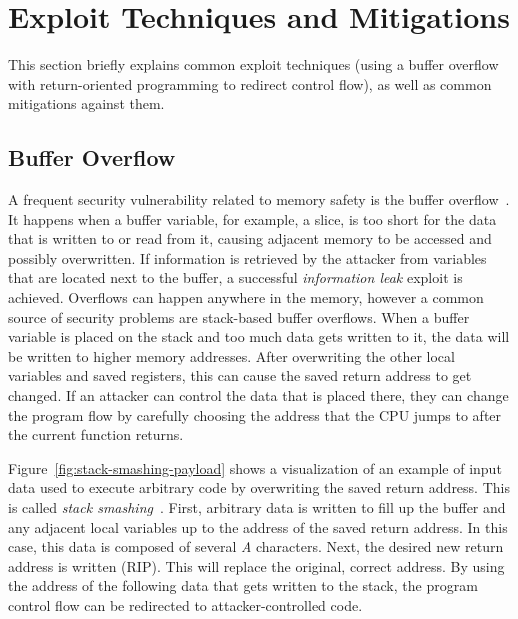
\section{Exploit Techniques and Mitigations}\label{sec:background:exploit-techniques}

This section briefly explains common exploit techniques (using a buffer overflow with return-oriented programming to
redirect control flow), as well as common mitigations against them.



\subsection{Buffer Overflow}\label{subsec:background:exploit-techniques:buffer-overflow}

A frequent security vulnerability related to memory safety is the buffer overflow~\cite{larochelle2001}.
It happens when a buffer variable, for example, a slice, is too short for the data that is written to or read from it,
causing adjacent memory to be accessed and possibly overwritten.
If information is retrieved by the attacker from variables that are located next to the buffer, a successful
\textit{information leak} exploit is achieved.
Overflows can happen anywhere in the memory, however a common source of security problems are stack-based buffer
overflows.
When a buffer variable is placed on the stack and too much data gets written to it, the data will be written to higher
memory addresses.
After overwriting the other local variables and saved registers, this can cause the saved return address to get changed.
If an attacker can control the data that is placed there, they can change the program flow by carefully choosing the
address that the \acrshort{CPU} jumps to after the current function returns.

Figure~\ref{fig:stack-smashing-payload} shows a visualization of an example of input data used to execute arbitrary code
by overwriting the saved return address.
This is called \textit{stack smashing}~\cite{smith1997}.
First, arbitrary data is written to fill up the buffer and any adjacent local variables up to the address of the
saved return address.
In this case, this data is composed of several \textit{A} characters.
Next, the desired new return address is written (\acrshort{RIP}).
This will replace the original, correct address.
By using the address of the following data that gets written to the stack, the program control flow can be redirected to
attacker-controlled code.

